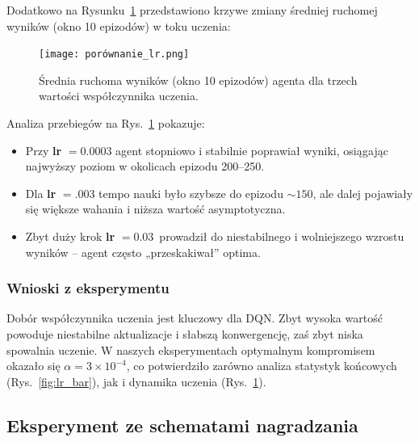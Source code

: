 \documentclass[a4paper,12pt]{article}
\begin{document}
\clearpage
Dodatkowo na Rysunku~\ref{fig:lr_curve} przedstawiono krzywe zmiany średniej ruchomej wyników (okno 10 epizodów) w toku uczenia:

\begin{figure}[H]
  \centering
  \texttt{[image: porównanie\_lr.png]}
  \caption{Średnia ruchoma wyników (okno 10 epizodów) agenta dla trzech wartości współczynnika uczenia.}
  \label{fig:lr_curve}
\end{figure}

Analiza przebiegów na Rys.~\ref{fig:lr_curve} pokazuje:
\begin{itemize}
  \item Przy \textbf{lr} \(=0.0003\) agent stopniowo i stabilnie poprawiał wyniki, osiągając najwyższy poziom w okolicach epizodu 200–250.
  \item Dla \textbf{lr} \(=.003\) tempo nauki było szybsze do epizodu \(\sim150\), ale dalej pojawiały się większe wahania i niższa wartość asymptotyczna.
  \item Zbyt duży krok \textbf{lr} \(= 0.03\)\ prowadził do niestabilnego i wolniejszego wzrostu wyników – agent często „przeskakiwał” optima.
\end{itemize}

\subsubsection{Wnioski z eksperymentu}
Dobór współczynnika uczenia jest kluczowy dla DQN. Zbyt wysoka wartość powoduje niestabilne aktualizacje i słabszą konwergencję, zaś zbyt niska spowalnia uczenie. W naszych eksperymentach optymalnym kompromisem okazało się \(\alpha=3\times10^{-4}\), co potwierdziło zarówno analiza statystyk końcowych (Rys.~\ref{fig:lr_bar}), jak i dynamika uczenia (Rys.~\ref{fig:lr_curve}).
\clearpage





\subsection{Eksperyment ze schematami nagradzania}
\label{sec:experiments:reward_schemes}
\end{document}
